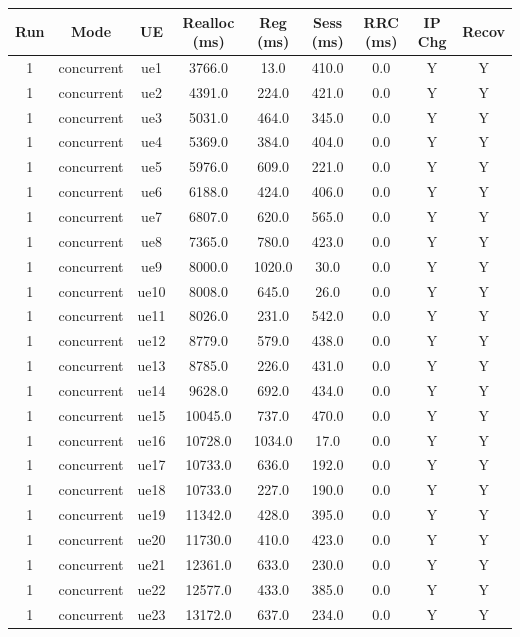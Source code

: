 \begin{table}[ht]
\centering
\begin{tabular}{|c|c|c|c|c|c|c|c|c|}
\hline
Run & Mode & UE & Realloc (ms) & Reg (ms) & Sess (ms) & RRC (ms) & IP Chg & Recov \\
\hline
1 & concurrent & ue1 & 3766.0 & 13.0 & 410.0 & 0.0 & Y & Y \\
1 & concurrent & ue2 & 4391.0 & 224.0 & 421.0 & 0.0 & Y & Y \\
1 & concurrent & ue3 & 5031.0 & 464.0 & 345.0 & 0.0 & Y & Y \\
1 & concurrent & ue4 & 5369.0 & 384.0 & 404.0 & 0.0 & Y & Y \\
1 & concurrent & ue5 & 5976.0 & 609.0 & 221.0 & 0.0 & Y & Y \\
1 & concurrent & ue6 & 6188.0 & 424.0 & 406.0 & 0.0 & Y & Y \\
1 & concurrent & ue7 & 6807.0 & 620.0 & 565.0 & 0.0 & Y & Y \\
1 & concurrent & ue8 & 7365.0 & 780.0 & 423.0 & 0.0 & Y & Y \\
1 & concurrent & ue9 & 8000.0 & 1020.0 & 30.0 & 0.0 & Y & Y \\
1 & concurrent & ue10 & 8008.0 & 645.0 & 26.0 & 0.0 & Y & Y \\
1 & concurrent & ue11 & 8026.0 & 231.0 & 542.0 & 0.0 & Y & Y \\
1 & concurrent & ue12 & 8779.0 & 579.0 & 438.0 & 0.0 & Y & Y \\
1 & concurrent & ue13 & 8785.0 & 226.0 & 431.0 & 0.0 & Y & Y \\
1 & concurrent & ue14 & 9628.0 & 692.0 & 434.0 & 0.0 & Y & Y \\
1 & concurrent & ue15 & 10045.0 & 737.0 & 470.0 & 0.0 & Y & Y \\
1 & concurrent & ue16 & 10728.0 & 1034.0 & 17.0 & 0.0 & Y & Y \\
1 & concurrent & ue17 & 10733.0 & 636.0 & 192.0 & 0.0 & Y & Y \\
1 & concurrent & ue18 & 10733.0 & 227.0 & 190.0 & 0.0 & Y & Y \\
1 & concurrent & ue19 & 11342.0 & 428.0 & 395.0 & 0.0 & Y & Y \\
1 & concurrent & ue20 & 11730.0 & 410.0 & 423.0 & 0.0 & Y & Y \\
1 & concurrent & ue21 & 12361.0 & 633.0 & 230.0 & 0.0 & Y & Y \\
1 & concurrent & ue22 & 12577.0 & 433.0 & 385.0 & 0.0 & Y & Y \\
1 & concurrent & ue23 & 13172.0 & 637.0 & 234.0 & 0.0 & Y & Y \\

\end{tabular}
\end{table}
